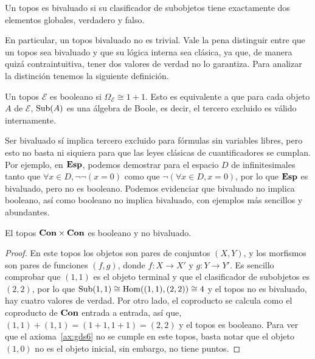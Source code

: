 \begin{definition}[label=def:bivaluado]
  Un topos es bivaluado si su clasificador de subobjetos tiene exactamente dos elementos globales, verdadero
  y falso.
\end{definition}

En particular, un topos bivaluado no es trivial. Vale la pena distinguir entre que un topos sea bivaluado y que su lógica interna sea clásica,
ya que, de manera quizá contraintuitiva, tener dos valores de verdad no lo garantiza. Para analizar la distinción tenemos la siguiente definición.

\begin{definition}
  Un topos $\mathcal{E}$ es booleano si $\Omega_{\mathcal{E}} \cong 1+1$. Esto es equivalente a que para
  cada objeto $A$ de $\mathcal{E}$, $\operatorname{Sub}(A)$ es una álgebra de Boole, es decir,
  el tercero excluido es válido internamente.
\end{definition}

Ser bivaluado sí implica tercero excluido para fórmulas sin variables libres, pero esto no basta
ni siquiera para que las leyes clásicas de cuantificadores se cumplan. Por
ejemplo, en $\mathbf{Esp}$, podemos
demostrar para el espacio $D$ de infinitesimales tanto que $\forall x\in D, \neg\neg(x=0)$ como que $\neg(\forall x\in D, x=0)$,
por lo que $\mathbf{Esp}$ es bivaluado, pero no es booleano. Podemos evidenciar que bivaluado no implica booleano, 
así como booleano no implica bivaluado, con ejemplos más sencillos y abundantes.

\begin{proposition}
  El topos $\mathbf{Con}\times  \mathbf{Con}$ es booleano y no bivaluado. 
\end{proposition}
\begin{proof}
  En este topos los objetos son pares de conjuntos $(X,Y)$, y los morfismos son pares de funciones 
  $(f,g)$, donde $f\colon X\to X'$ y $g\colon Y\to Y'$. Es sencillo comprobar que $(1,1)$ es el objeto terminal y que
  el clasificador de subobjetos es $(2,2)$, por lo que $\operatorname{Sub}(1,1)\cong \operatorname{Hom}((1,1),(2,2))\cong 4$ y el topos no es bivaluado,
  hay cuatro valores de verdad. Por otro lado, el coproducto se calcula como el
  coproducto de $\mathbf{Con}$
  entrada a entrada,
  así que, $(1,1)+(1,1)=(1+1,1+1)=(2,2)$ y el topos es booleano. Para ver que el axioma~\ref{ax:gds6} no se cumple en este topos, 
  basta notar que el objeto $(1,0)$ no es el objeto inicial, sin embargo, no tiene puntos.
\end{proof}

